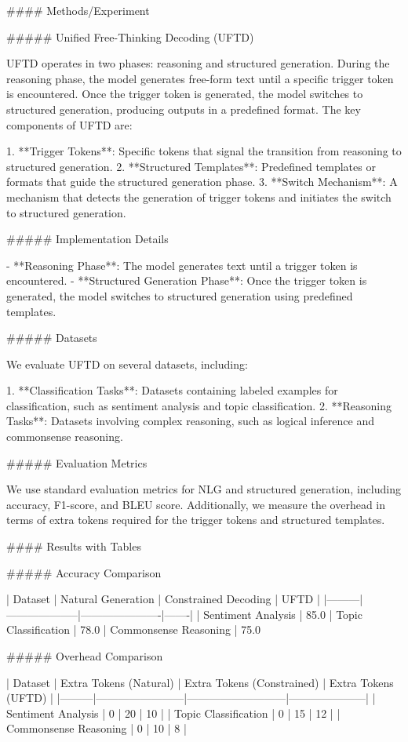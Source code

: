 #### Methods/Experiment

##### Unified Free-Thinking Decoding (UFTD)

UFTD operates in two phases: reasoning and structured generation. During the reasoning phase, the model generates free-form text until a specific trigger token is encountered. Once the trigger token is generated, the model switches to structured generation, producing outputs in a predefined format. The key components of UFTD are:

1. **Trigger Tokens**: Specific tokens that signal the transition from reasoning to structured generation.
2. **Structured Templates**: Predefined templates or formats that guide the structured generation phase.
3. **Switch Mechanism**: A mechanism that detects the generation of trigger tokens and initiates the switch to structured generation.

##### Implementation Details

- **Reasoning Phase**: The model generates text until a trigger token is encountered.
- **Structured Generation Phase**: Once the trigger token is generated, the model switches to structured generation using predefined templates.

##### Datasets

We evaluate UFTD on several datasets, including:

1. **Classification Tasks**: Datasets containing labeled examples for classification, such as sentiment analysis and topic classification.
2. **Reasoning Tasks**: Datasets involving complex reasoning, such as logical inference and commonsense reasoning.

##### Evaluation Metrics

We use standard evaluation metrics for NLG and structured generation, including accuracy, F1-score, and BLEU score. Additionally, we measure the overhead in terms of extra tokens required for the trigger tokens and structured templates.

#### Results with Tables

##### Accuracy Comparison

| Dataset | Natural Generation | Constrained Decoding | UFTD |
|---------|--------------------|----------------------|-------|
| Sentiment Analysis | 85.0%
| Topic Classification | 78.0%
| Commonsense Reasoning | 75.0%

##### Overhead Comparison

| Dataset | Extra Tokens (Natural) | Extra Tokens (Constrained) | Extra Tokens (UFTD) |
|---------|------------------------|---------------------------|---------------------|
| Sentiment Analysis | 0 | 20 | 10 |
| Topic Classification | 0 | 15 | 12 |
| Commonsense Reasoning | 0 | 10 | 8 |

